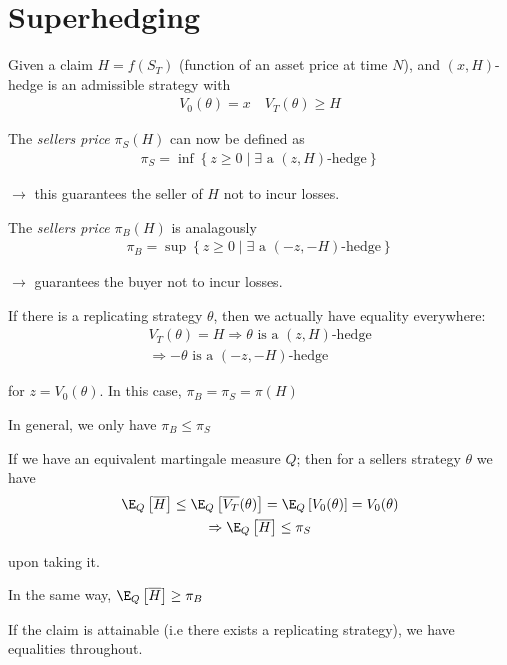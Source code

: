 \section{Superhedging}
Given a claim $H = f(S_T)$ (function of an asset price at time $N$), and $(x,H)$-hedge is an admissible strategy with 
\begin{equation*}
  \begin{gathered}
    V_0(\theta) = x\quad V_T(\theta)\geq H
  \end{gathered}
\end{equation*}\par
\noindent The \textit{sellers price} $\pi_S(H)$ can now be defined as
\begin{equation*}
  \begin{gathered}
    \pi_S = \inf\left\{z\geq0\mid \exists \text{ a $(z,H)$-hedge}\right\}
  \end{gathered}
\end{equation*}\par
\noindent $\rightarrow$ this guarantees the seller of $H$ not to incur losses.
\par\bigskip
\noindent The \textit{sellers price} $\pi_B(H)$ is analagously 
\begin{equation*}
  \begin{gathered}
    \pi_B = \sup\left\{z\geq0\mid\exists\text{ a $(-z,-H)$-hedge}\right\}
  \end{gathered}
\end{equation*}\par
\noindent $\rightarrow$ guarantees the buyer not to incur losses.\par
\noindent If there is a replicating strategy $\theta$, then we actually have equality everywhere:
\begin{equation*}
  \begin{gathered}
    V_T(\theta) = H\Rightarrow \theta\text{ is a } (z,H)\text{-hedge}\\
    \Rightarrow -\theta\text{ is a } (-z,-H)\text{-hedge}
  \end{gathered}
\end{equation*}\par
\noindent for $z = V_0(\theta)$. In this case, $\pi_B =\pi_S = \pi(H)$
\par\bigskip
\noindent In general, we only have $\pi_B\leq \pi_S$\par
\noindent If we have an equivalent martingale measure $Q$; then for a sellers strategy $\theta$ we have
\begin{equation*}
  \begin{gathered}
    \E_Q\left[\overline{H}\right]\leq \E_Q\left[\overline{V_T}(\theta)\right] = \E_Q\left[V_0(\theta)\right] = V_0(\theta)\\
    \Rightarrow \E_Q\left[\overline{H}\right]\leq \pi_S
  \end{gathered}
\end{equation*}\par
\noindent upon taking it.\par
\noindent In the same way, $\E_Q\left[\overline{H}\right]\geq \pi_B$\par
\noindent If the claim is attainable (i.e there exists a replicating strategy), we have equalities throughout.
\par\bigskip
